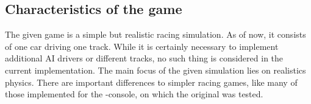 %
%


\subsection{Characteristics of the game}



The given game is a simple but realistic racing simulation. As of now, it consists of one car driving one track. While it is certainly necessary to implement additional AI drivers or different tracks, no such thing is considered in the current implementation. The main focus of the given simulation lies on realistics physics. There are important differences to simpler racing games, like many of those implemented for the -console, on which the original  was tested.

